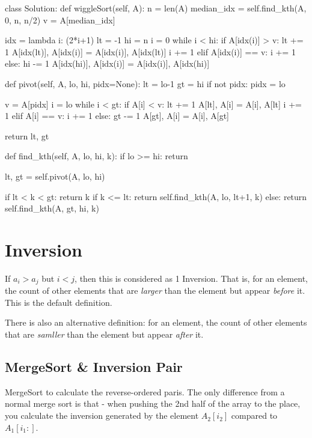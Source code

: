 \begin{python}
class Solution:
  def wiggleSort(self, A):
    n = len(A)
    median_idx = self.find_kth(A, 0, n, n/2)
    v = A[median_idx]
    
    idx = lambda i: (2*i+1)%
    lt = -1
    hi = n
    i = 0
    while i < hi:
      if A[idx(i)] > v:
        lt += 1
        A[idx(lt)], A[idx(i)] = A[idx(i)], A[idx(lt)]
        i += 1
      elif A[idx(i)] == v:
        i += 1
      else:
        hi -= 1
        A[idx(hi)], A[idx(i)] = A[idx(i)], A[idx(hi)]

  def pivot(self, A, lo, hi, pidx=None):
    lt = lo-1
    gt = hi
    if not pidx: pidx = lo

    v = A[pidx]
    i = lo
    while i < gt:
      if A[i] < v:
        lt += 1
        A[lt], A[i] = A[i], A[lt]
        i += 1
      elif A[i] == v:
        i += 1
      else:
        gt -= 1
        A[gt], A[i] = A[i], A[gt]

    return lt, gt

  def find_kth(self, A, lo, hi, k):
    if lo >= hi: return

    lt, gt = self.pivot(A, lo, hi)
    
    if lt < k < gt:
      return k
    if k <= lt:
      return self.find_kth(A, lo, lt+1, k)
    else:
      return self.find_kth(A, gt, hi, k)
\end{python}

\section{Inversion}
If $a_i > a_j$ but $i<j$, then this is considered as 1 Inversion. That is, for an element, the count of other elements that are \textit{larger} than the element but appear \textit{before} it. This is the default definition. 

There is also an alternative definition: for an element, the count of other elements that are \textit{samller} than the element but appear \textit{after} it. 

\subsection{MergeSort \& Inversion Pair}
MergeSort to calculate the reverse-ordered paris. The only difference from a normal
merge sort is that - when pushing the 2nd half of the array to the place, you calculate
the inversion generated by the element $A_2[i_2]$ compared to $A_1[i_1:]$.

